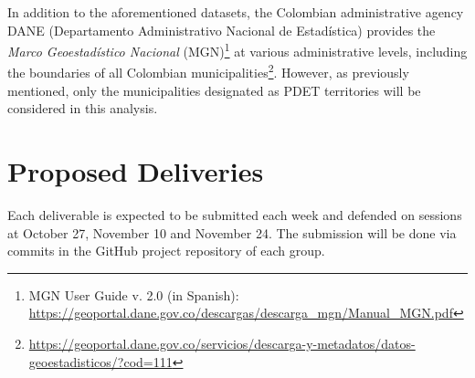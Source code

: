 \documentclass[12pt]{article}
\begin{document}
In addition to the aforementioned datasets, the Colombian administrative agency DANE (Departamento Administrativo Nacional de Estadística) provides the \textit{Marco Geoestadístico Nacional} (MGN)\footnote{MGN User Guide v. 2.0 (in Spanish): \url{https://geoportal.dane.gov.co/descargas/descarga_mgn/Manual_MGN.pdf}} at various administrative levels, including the boundaries of all Colombian municipalities\footnote{\url{https://geoportal.dane.gov.co/servicios/descarga-y-metadatos/datos-geoestadisticos/?cod=111}}. However, as previously mentioned, only the municipalities designated as PDET territories will be considered in this analysis.

\section{Proposed Deliveries}
Each deliverable is expected to be submitted each week and defended on sessions at October 27, November 10 and November 24.  The submission will be done via commits in the GitHub project repository of each group.
\end{document}
